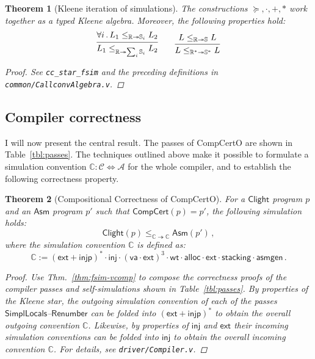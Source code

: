\documentclass[11pt,oneside]{book}
\newtheorem{theorem}{Theorem}[chapter]
\theoremstyle{definition}
\newcommand{\kw}[1]{\ensuremath{ \mathsf{#1} }}
\newcommand{\scref}{\succeq} %
\begin{document}
\begin{theorem}[Kleene iteration of simulations] \label{thm:simk} %
The constructions ${\scref}, {\cdot}, {+}, {*}$
work together as a typed Kleene algebra.
Moreover, the following properties hold:
\[
  \begin{prooftree}
    \hypo{\forall i \,.\,
      L_1 \le_{\mathbb{R} \twoheadrightarrow \mathbb{S}_i} L_2}
    \infer1{
      L_1 \le_{\mathbb{R} \twoheadrightarrow \sum_i \mathbb{S}_i} L_2}
  \end{prooftree}
  \qquad
  \begin{prooftree}
    \hypo{L \le_{\mathbb{R} \twoheadrightarrow \mathbb{S}} L}
    \infer1{L \le_{\mathbb{R}^* \twoheadrightarrow \mathbb{S}^*} L}
  \end{prooftree}
\]
\begin{proof}
See \texttt{cc\_star\_fsim} and the preceding definitions
in \texttt{common/CallconvAlgebra.v}.
\end{proof}
\end{theorem}


\subsection{Compiler correctness} \label{sec:comppass} %

I will now present the central result.
The passes of CompCertO are shown in Table~\ref{tbl:passes}.
The techniques outlined above make it possible to formulate
a simulation convention
$\mathbb{C} : \mathcal{C} \Leftrightarrow \mathcal{A}$
for the whole compiler, %
and to establish the following correctness property.

\begin{theorem}[Compositional Correctness of CompCertO] \label{thm:compc} %
For a \kw{Clight} program $p$
and an \kw{Asm} program $p'$ such that
$\kw{CompCert}(p) = p'$,
the following simulation holds:
\[
    \kw{Clight}(p) \le_{\mathbb{C} \twoheadrightarrow \mathbb{C}}
    \kw{Asm}(p') \,,
\]
where the simulation convention $\mathbb{C}$ is defined as:
\[
    \mathbb{C} := (\kw{ext} + \kw{injp})^* \cdot \kw{inj} \cdot
      (\kw{va} \cdot \kw{ext})^3 \cdot
      \kw{wt} \cdot \kw{alloc} \cdot
      \kw{ext} \cdot %
      \kw{stacking} \cdot
      \kw{asmgen}
      \,.
\]
\begin{proof}
Use Thm.~\ref{thm:fsim-vcomp} to compose
the correctness proofs of the compiler passes and
self-simulations shown in Table~\ref{tbl:passes}.
By properties of the Kleene star,
the outgoing simulation convention of each of the
passes \kw{SimplLocals}--\kw{Renumber} %
can be folded into $(\kw{ext} + \kw{injp})^*$
to obtain the overall outgoing convention $\mathbb{C}$.
Likewise, by properties of $\kw{inj}$ and $\kw{ext}$
their incoming simulation conventions
can be folded into $\kw{inj}$
to obtain the overall incoming convention $\mathbb{C}$.
For details, see \texttt{driver/Compiler.v}.
\end{proof}
\end{theorem}
\end{document}
